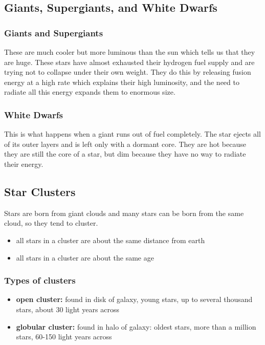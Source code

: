 \documentclass[12pt]{article}
\begin{document}
\subsection{Giants, Supergiants, and White Dwarfs}
\subsubsection{Giants and Supergiants}
These are much cooler but more luminous than the sun which tells us that they are huge. These stars have almost exhausted their hydrogen fuel supply and are trying not to collapse under their own weight. They do this by releasing fusion energy at a high rate which explains their high luminosity, and the need to radiate all this energy expands them to enormous size.

\subsubsection{White Dwarfs}
This is what happens when a giant runs out of fuel completely. The star ejects all of its outer layers and is left only with a dormant core. They are hot because they are still the core of a star, but dim because they have no way to radiate their energy.

\subsection{Star Clusters}
Stars are born from giant clouds and many stars can be born from the same cloud, so they tend to cluster.
\begin{itemize}
    \item all stars in a cluster are about the same distance from earth
    \item all stars in a cluster are about the same age
\end{itemize}

\subsubsection{Types of clusters}
\begin{itemize}
    \item \textbf{open cluster: }found in disk of galaxy, young stars, up to several thousand stars, about 30 light years across
    \item \textbf{globular cluster: }found in halo of galaxy: oldest stars, more than a million stars, 60-150 light years across
\end{itemize}
\end{document}
